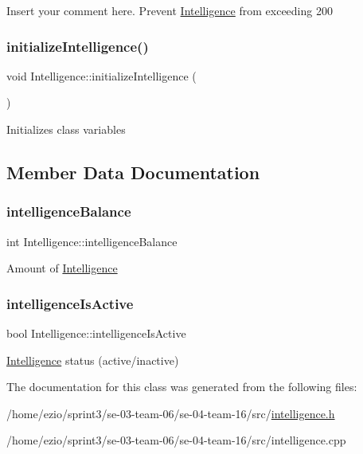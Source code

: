 Insert your comment here. Prevent \hyperlink{classIntelligence}{Intelligence} from exceeding 200 \mbox{\label{classIntelligence_a7a85f46b0628c2c018a729a15f78b322}} 
\subsubsection{\texorpdfstring{initialize\+Intelligence()}{initializeIntelligence()}}
{\footnotesize\ttfamily void Intelligence\+::initialize\+Intelligence (\begin{DoxyParamCaption}{ }\end{DoxyParamCaption})}

Initializes class variables 

\subsection{Member Data Documentation}
\mbox{\label{classIntelligence_a20fc418262dd34db0d9e99d81d6a7544}} 
\subsubsection{\texorpdfstring{intelligence\+Balance}{intelligenceBalance}}
{\footnotesize\ttfamily int Intelligence\+::intelligence\+Balance}

Amount of \hyperlink{classIntelligence}{Intelligence} \mbox{\label{classIntelligence_ad8d4fda31beb86dc434f71fe6c683ae9}} 
\subsubsection{\texorpdfstring{intelligence\+Is\+Active}{intelligenceIsActive}}
{\footnotesize\ttfamily bool Intelligence\+::intelligence\+Is\+Active}

\hyperlink{classIntelligence}{Intelligence} status (active/inactive) 

The documentation for this class was generated from the following files\+:\begin{DoxyCompactItemize}
\item 
/home/ezio/sprint3/se-\/03-\/team-\/06/se-\/04-\/team-\/16/src/\hyperlink{intelligence_8h}{intelligence.\+h}\item 
/home/ezio/sprint3/se-\/03-\/team-\/06/se-\/04-\/team-\/16/src/intelligence.\+cpp\end{DoxyCompactItemize}
